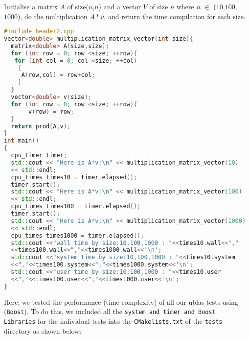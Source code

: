 \documentclass[11pt]{article}
\begin{document}
Initialise a matrix $A$ of size($n$,$n$) and a vector $V$ of size $n$ where $n$ $\in$ ($10$,$100$,$1000$), do the multiplication $A*v$, and return the time compilation for each size.\\
\begin{lstlisting}[language=c++]
#include header2.cpp
vector<double> multiplication_matrix_vector(int size){
  matrix<double> A(size,size);
  for (int row = 0; row <size; ++row){
   for (int col = 0; col <size; ++col)
    {
     A(row,col) = row+col;
    }
  }
  vector<double> v(size);
  for (int row = 0; row <size; ++row){
       v(row) = row;
  }
  return prod(A,v);
}
int main()
{
  cpu_timer timer;
  std::cout << "Here is A*v:\n" << multiplication_matrix_vector(10)
  << std::endl;
  cpu_times times10 = timer.elapsed();
  timer.start();
  std::cout << "Here is A*v:\n" << multiplication_matrix_vector(100)
  << std::endl;
  cpu_times times100 = timer.elapsed();
  timer.start();  
  std::cout << "Here is A*v:\n" << multiplication_matrix_vector(1000)
  << std::endl;
  cpu_times times1000 = timer.elapsed();
  std::cout <<"wall time by size:10,100,1000 : "<<times10.wall<<","
  <<times100.wall<<","<<times1000.wall<<'\n';
  std::cout <<"system time by size:10,100,1000 : "<<times10.system
  <<","<<times100.system<<","<<times1000.system<<'\n';
  std::cout <<"user time by size:10,100,1000 : "<<times10.user
  <<","<<times100.user<<","<<times1000.user<<'\n'; 
}
\end{lstlisting}

\vspace{9mm}
Here, we tested the performance (time complexity)  of all our ublas tests using (\texttt{Boost}). To do this, we included all the \texttt{system and timer and Boost Libraries} for the individual tests into the \texttt{CMakelists.txt} of the  \texttt{tests} directory as shown below: \\
\end{document}
